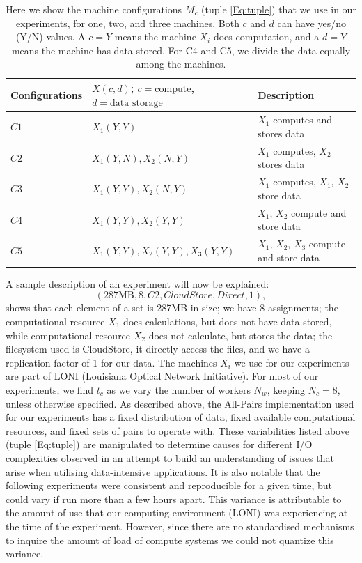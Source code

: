 \documentclass{rspublic}
\begin{document}
\begin{table}
\begin{center}
    \begin{tabular}{ | l | l | l |}
    \hline
    Configurations & $X(c,d)$; $c= \mbox{compute}$, $d=\mbox{data storage}$ & Description  \\ \hline
    $C1$ & $X_1(Y,Y)$  & $X_1$ computes and stores data\\ \hline    
    $C2$ & $X_1(Y,N), X_2(N,Y)$  & $X_1$ computes, $X_2$ stores data \\ \hline
    $C3$ & $X_1(Y,Y), X_2(N,Y)$  & $X_1$ computes, $X_1$, $X_2$ store data \\ \hline
    $C4$ & $X_1(Y,Y), X_2(Y,Y)$  & $X_1$, $X_2$ compute and store data \\ \hline
    $C5$ & $X_1(Y,Y), X_2(Y,Y), X_3(Y,Y)$  & $X_1$, $X_2$, $X_3$ compute and store data \\ 
    \hline
    \end{tabular}
\end{center}
    \caption{Here we show the machine configurations $M_c$ (tuple
\ref{Eq:tuple}) that we use in our experiments, for one, two, and three
machines. Both $c$ and $d$ can have yes/no (Y/N) values. A $c = Y$ means
the machine $X_i$ does computation, and a $d = Y$ means the machine has
data stored. For C4 and C5, we divide the data equally among the
machines.}
    \label{Tab:Configs}
\end{table}


A sample description of an experiment will now be explained:
 \begin{equation}
(287\mbox{MB}, 8, C2, CloudStore, Direct, 1),
\end{equation}
shows that each element of a set is 287MB in size; we have 8
assignments; the computational resource $X_1$ does calculations, but
does not have data stored, while computational resource $X_2$ does not
calculate, but stores the data; the filesystem used is CloudStore, it
directly access the files, and we have a replication factor of 1 for our
data. The machines $X_i$ we use for our experiments are part of LONI
(Louisiana Optical Network Initiative). For most of our experiments, we
find $t_c$ as we vary the number of workers $N_w$, keeping $N_c=8$,
 unless otherwise specified. As described
above, the All-Pairs implementation used for our experiments has a fixed
distribution of data, fixed available computational resources, and fixed
sets of pairs to operate with. These variabilities listed above (tuple
\ref{Eq:tuple}) are manipulated to determine causes for different I/O
complexities observed in an attempt to build an understanding of issues
that arise when utilising data-intensive applications. It is also
notable that the following experiments were consistent and reproducible
for a given time, but could vary if run more than a few hours apart.
This variance is attributable to the amount of use that our computing
environment (LONI) was experiencing at the time of the experiment. However, since 
there are no standardised mechanisms to inquire the amount of load of compute systems we could not quantize this variance.
\end{document}
